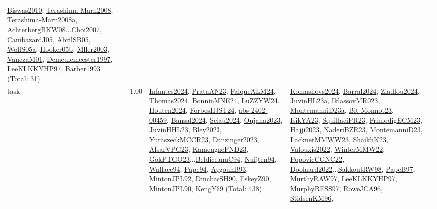 {\begin{longtable}{p{3cm}r>{\raggedright\arraybackslash}p{6cm}>{\raggedright\arraybackslash}p{6cm}>{\raggedright\arraybackslash}p{8cm}}
\hyperref[detail:Biswas2010]{Biswas2010}, \hyperref[detail:Terashima-Marn2008]{Terashima-Marn2008}, \hyperref[detail:Terashima-Marn2008a]{Terashima-Marn2008a}, \hyperref[detail:AchterbergBKW08]{AchterbergBKW08}...\hyperref[detail:Choi2007]{Choi2007}, \hyperref[detail:CambazardJ05]{CambazardJ05}, \hyperref[detail:AbrilSB05]{AbrilSB05}, \hyperref[detail:WolfS05a]{WolfS05a}, \hyperref[detail:Hooker05b]{Hooker05b}, \hyperref[detail:Mller2003]{Mller2003}, \hyperref[detail:VanczaM01]{VanczaM01}, \hyperref[detail:Demeulemeester1997]{Demeulemeester1997}, \hyperref[detail:LeeKLKKYHP97]{LeeKLKKYHP97}, \hyperref[detail:Barber1993]{Barber1993} (Total: 31)\\
\index{task}\index{Scheduling!task}task &  1.00 & \hyperref[detail:Infantes2024]{Infantes2024}, \hyperref[detail:PrataAN23]{PrataAN23}, \hyperref[detail:FalqueALM24]{FalqueALM24}, \hyperref[detail:Thomas2024]{Thomas2024}, \hyperref[detail:BonninMNE24]{BonninMNE24}, \hyperref[detail:LuZZYW24]{LuZZYW24}, \hyperref[detail:Houten2024]{Houten2024}, \hyperref[detail:ForbesHJST24]{ForbesHJST24}, \hyperref[detail:abs-2402-00459]{abs-2402-00459}, \hyperref[detail:Bansal2024]{Bansal2024}, \hyperref[detail:Sciau2024]{Sciau2024}, \hyperref[detail:Oujana2023]{Oujana2023}, \hyperref[detail:JuvinHHL23]{JuvinHHL23}, \hyperref[detail:Bley2023]{Bley2023}, \hyperref[detail:YuraszeckMCCR23]{YuraszeckMCCR23}, \hyperref[detail:Danzinger2023]{Danzinger2023}, \hyperref[detail:AfsarVPG23]{AfsarVPG23}, \hyperref[detail:KameugneFND23]{KameugneFND23}, \hyperref[detail:GokPTGO23]{GokPTGO23}...\hyperref[detail:BeldiceanuC94]{BeldiceanuC94}, \hyperref[detail:Nuijten94]{Nuijten94}, \hyperref[detail:Wallace94]{Wallace94}, \hyperref[detail:Pape94]{Pape94}, \hyperref[detail:AggounB93]{AggounB93}, \hyperref[detail:MintonJPL92]{MintonJPL92}, \hyperref[detail:DincbasSH90]{DincbasSH90}, \hyperref[detail:EskeyZ90]{EskeyZ90}, \hyperref[detail:MintonJPL90]{MintonJPL90}, \hyperref[detail:KengY89]{KengY89} (Total: 438) & \hyperref[detail:Komasilovs2024]{Komasilovs2024}, \hyperref[detail:Barral2024]{Barral2024}, \hyperref[detail:Ziadlou2024]{Ziadlou2024}, \hyperref[detail:JuvinHL23a]{JuvinHL23a}, \hyperref[detail:IklassovMR023]{IklassovMR023}, \hyperref[detail:MontemanniD23a]{MontemanniD23a}, \hyperref[detail:Bit-Monnot23]{Bit-Monnot23}, \hyperref[detail:IsikYA23]{IsikYA23}, \hyperref[detail:SquillaciPR23]{SquillaciPR23}, \hyperref[detail:FrimodigECM23]{FrimodigECM23}, \hyperref[detail:Hajji2023]{Hajji2023}, \hyperref[detail:NaderiBZR23]{NaderiBZR23}, \hyperref[detail:MontemanniD23]{MontemanniD23}, \hyperref[detail:LacknerMMWW23]{LacknerMMWW23}, \hyperref[detail:ShaikhK23]{ShaikhK23}, \hyperref[detail:Valouxis2022]{Valouxis2022}, \hyperref[detail:WinterMMW22]{WinterMMW22}, \hyperref[detail:PopovicCGNC22]{PopovicCGNC22}, \hyperref[detail:Doolaard2022]{Doolaard2022}...\hyperref[detail:SakkoutRW98]{SakkoutRW98}, \hyperref[detail:PapeB97]{PapeB97}, \hyperref[detail:MurthyRAW97]{MurthyRAW97}, \hyperref[detail:LeeKLKKYHP97]{LeeKLKKYHP97}, \hyperref[detail:MurphyRFSS97]{MurphyRFSS97}, \hyperref[detail:RoweJCA96]{RoweJCA96}, \hyperref[detail:StidsenKM96]{StidsenKM96}, 
\end{longtable}}

